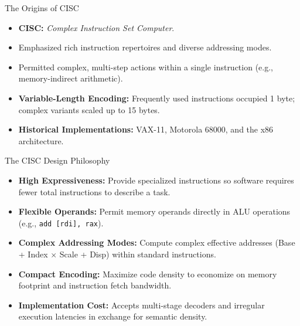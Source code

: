 \documentclass[aspectratio=169,11pt,t]{beamer}
\newcommand{\key}[1]{\textbf{#1}}
\newcommand{\code}[1]{\texttt{#1}}
\begin{document}
\begin{frame}{The Origins of CISC}
\large
\begin{itemize}\setlength{\itemsep}{8pt}
  \item \key{CISC:} \emph{Complex Instruction Set Computer}.
  \item Emphasized rich instruction repertoires and diverse addressing modes.
  \item Permitted complex, multi-step actions within a single instruction (e.g., memory-indirect arithmetic).
  \item \key{Variable-Length Encoding:} Frequently used instructions occupied 1 byte; complex variants scaled up to 15 bytes.
  \item \key{Historical Implementations:} VAX-11, Motorola 68000, and the x86 architecture.
\end{itemize}
\end{frame}


\begin{frame}{The CISC Design Philosophy}
\large
\begin{itemize}\setlength{\itemsep}{7pt}
  \item \key{High Expressiveness:} Provide specialized instructions so software requires fewer total instructions to describe a task.
  \item \key{Flexible Operands:} Permit memory operands directly in ALU operations (e.g., \code{add [rdi], rax}).
  \item \key{Complex Addressing Modes:} Compute complex effective addresses (Base + Index $\times$ Scale + Disp) within standard instructions.
  \item \key{Compact Encoding:} Maximize code density to economize on memory footprint and instruction fetch bandwidth.
  \item \key{Implementation Cost:} Accepts multi-stage decoders and irregular execution latencies in exchange for semantic density.
\end{itemize}
\end{frame}

\end{document}
